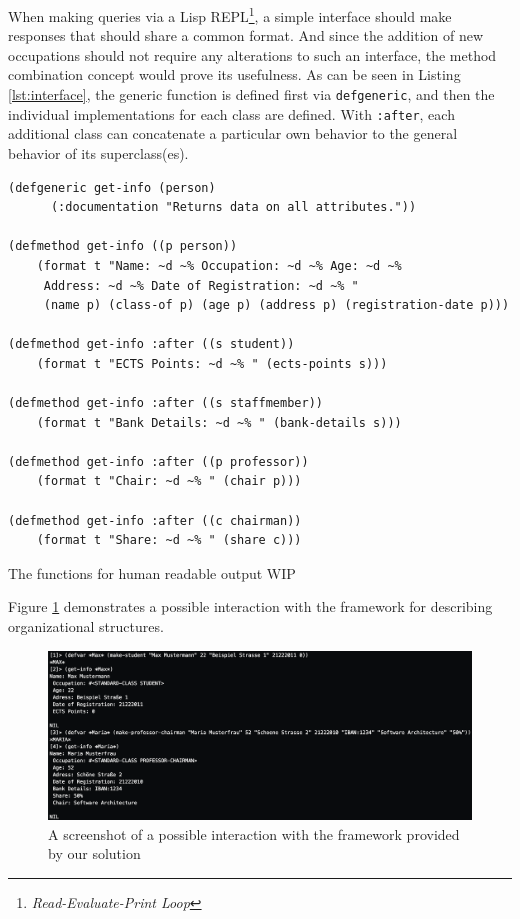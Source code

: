 \documentclass[oribibl]{llncs}
\begin{document}
When making queries via a Lisp REPL\footnote{\emph{Read-Evaluate-Print Loop}}, a simple interface should make responses that should share a common format. And since the addition of new occupations should not require any alterations to such an interface, the method combination concept would prove its usefulness. As can be seen in Listing \ref{lst:interface}, the generic function is defined first via \texttt{defgeneric}, and then the individual implementations for each class are defined. With \texttt{:after}, each additional class can concatenate a particular own behavior to the general behavior of its superclass(es).

\begin{listing}[]%
 \centering
\begin{verbatim}
(defgeneric get-info (person)
      (:documentation "Returns data on all attributes."))

(defmethod get-info ((p person))
    (format t "Name: ~d ~% Occupation: ~d ~% Age: ~d ~% 
     Address: ~d ~% Date of Registration: ~d ~% "
     (name p) (class-of p) (age p) (address p) (registration-date p)))

(defmethod get-info :after ((s student))
    (format t "ECTS Points: ~d ~% " (ects-points s)))

(defmethod get-info :after ((s staffmember))
    (format t "Bank Details: ~d ~% " (bank-details s)))

(defmethod get-info :after ((p professor))
    (format t "Chair: ~d ~% " (chair p)))

(defmethod get-info :after ((c chairman))
    (format t "Share: ~d ~% " (share c)))

\end{verbatim}
\caption{The functions for human readable output WIP}
\label{lst:interface}
\end{listing}

Figure \ref{fig:repl} demonstrates a possible interaction with the framework for describing organizational structures.

\begin{figure}[]
    \centering
    \includegraphics[width=1\textwidth]{images/repl.png}
    \caption{A screenshot of a possible interaction with the framework provided by our solution}
    \label{fig:repl}
\end{figure}
\end{document}

